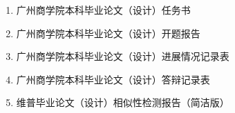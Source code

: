 
\begin{enumerate}[label=\arabic*.]
  \item 广州商学院本科毕业论文（设计）任务书
  \item 广州商学院本科毕业论文（设计）开题报告
  \item 广州商学院本科毕业论文（设计）进展情况记录表
  \item 广州商学院本科毕业论文（设计）答辩记录表
  \item 维普毕业论文（设计）相似性检测报告（简洁版）
\end{enumerate}
